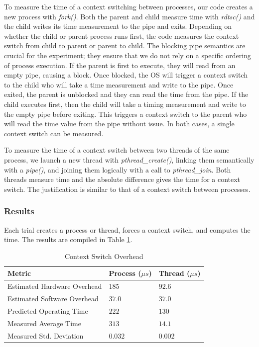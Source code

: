 \documentclass[sigconf]{acmart}
\begin{document}
To measure the time of a context switching between processes, our code creates a new process with \textit{fork()}. Both the parent and child measure time with \textit{rdtsc()} and the child writes its time measurement to the pipe and exits. Depending on whether the child or parent process runs first, the code measures the context switch from child to parent or parent to child. The blocking pipe semantics are crucial for the experiment; they ensure that we do not rely on a specific ordering of process execution. If the parent is first to execute, they will read from an empty pipe, causing a block. Once blocked, the OS will trigger a context switch to the child who will take a time measurement and write to the pipe. Once exited, the parent is unblocked and they can read the time from the pipe. If the child executes first, then the child will take a timing measurement and write to the empty pipe before exiting. This triggers a context switch to the parent who will read the time value from the pipe without issue. In both cases, a single context switch can be measured.

To measure the time of a context switch between two threads of the same process, we launch a new thread with \textit{pthread\_create()}, linking them semantically with a \textit{pipe()}, and joining them logically with a call to \textit{pthread\_join}. Both threads measure time and the absolute difference gives the time for a context switch. The justification is similar to that of a context switch between processes.

\subsubsection{Results}
Each trial creates a process or thread, forces a context switch, and computes the time. The results are compiled in Table \ref{ContextSwitchOverhead}.

\begin{table}[h!]
\centering
\caption{Context Switch Overhead}
\begin{tabular}{|l|l|l|}
\hline
\textbf{Metric}             & \textbf{Process ($\mu s$)}	& \textbf{Thread ($\mu s$)}	\\ \hline
Estimated Hardware Overhead & $185$							& $92.6$					\\ \hline
Estimated Software Overhead & $37.0$						& $37.0$					\\ \hline
Predicted Operating Time    & $222$							& $130$						\\ \hline
Measured Average Time     	& $313$							& $14.1$					\\ \hline
Measured Std. Deviation 	& $0.032$						& $0.002$					\\ \hline
\end{tabular}
\label{ContextSwitchOverhead}
\end{table}
\end{document}
